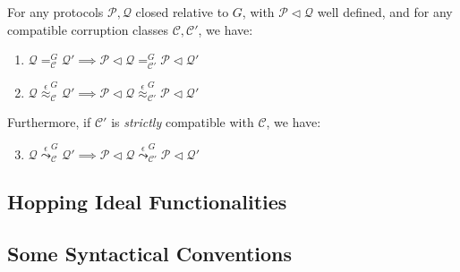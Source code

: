\begin{theorem}
  For any protocols $\mathcal{P}, \mathcal{Q}$ closed relative to $G$, with $\mathcal{P} \lhd \mathcal{Q}$
  well defined, and for any compatible corruption classes $\mathcal{C}, \mathcal{C'}$, we have:
  \begin{enumerate}
    \item $\mathcal{Q} =^G_{\mathcal{C}} \mathcal{Q}' \implies \mathcal{P} \lhd \mathcal{Q} =^G_{\mathcal{C}'} \mathcal{P} \lhd \mathcal{Q}'$
    \item $\mathcal{Q} \overset{\epsilon}{\approx}^G_{\mathcal{C}} \mathcal{Q}' \implies \mathcal{P} \lhd \mathcal{Q} \overset{\epsilon}{\approx}^G_{\mathcal{C}'} \mathcal{P} \lhd \mathcal{Q}'$
  \end{enumerate}

  Furthermore, if $\mathcal{C}'$ is \emph{strictly} compatible with $\mathcal{C}$,
  we have:
  \begin{enumerate}
    \setcounter{enumi}{2}
    \item $\mathcal{Q} \overset{\epsilon}{\leadsto}^G_{\mathcal{C}} \mathcal{Q}' \implies \mathcal{P} \lhd \mathcal{Q} \overset{\epsilon}{\leadsto}^G_{\mathcal{C}'} \mathcal{P} \lhd \mathcal{Q}'$
  \end{enumerate}
\end{theorem}

\subsection{Hopping Ideal Functionalities}

\subsection{Some Syntactical Conventions}
